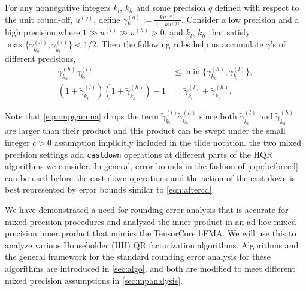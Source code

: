 \documentclass[review,onefignum,onetabnum]{siamart190516}
\begin{document}
\begin{lemma}\label{lem:mp}
	For any nonnegative integers $k_l$, $k_h$ and some precision $q$ defined with respect to the unit round-off, $u^{(q)}$, define $\gamma^{(q)}_{k} := \frac{k u^{(q)} }{1-ku^{(q)}}$.
	Consider a low precision and a high precision where $1 \gg u^{(l)} \gg u^{(h)}>0$, and $k_l$, $k_h$ that satisfy $\max\{\gamma^{(h)}_{k_{h}},\gamma^{(l)}_{k_{l}}\} < 1/2$.
	Then the following rules help us accumulate $\gamma$'s of different precisions,
	\begin{align}
	\gamma^{(h)}_{k_{h}}\gamma^{(l)}_{k_{l}} &\leq \min\{\gamma^{(h)}_{k_{h}},\gamma^{(l)}_{k_{l}} \},\\ 
	(1+\tilde{\gamma}_{k_l}^{(l)})(1+\tilde{\gamma}_{k_h}^{(h)}) -1 &= \tilde{\gamma}_{k_l}^{(l)}+\tilde{\gamma}_{k_h}^{(h)}. \label{eqn:mpgamma}
	\end{align}
\end{lemma}
Note that \cref{eqn:mpgamma} drops the term $\tilde{\gamma}_{k_l}^{(l)}\tilde{\gamma}_{k_h}^{(h)}$ since both $\tilde{\gamma}_{k_l}^{(l)}$ and $\tilde{\gamma}_{k_h}^{(h)}$ are larger than their product and this product can be swept under the small integer $c > 0$ assumption implicitly included in the tilde notation.
the two mixed precision settings add {\tt castdown} operations at different parts of the HQR algorithms we consider.
In general, error bounds in the fashion of \cref{eqn:beforecd} can be used before the cast down operations and the action of the cast down is best represented by error bounds similar to \cref{eqn:aftercd}.\par

We have demonstrated a need for rounding error analysis that is accurate for mixed precision procedures and analyzed the inner product in an ad hoc mixed precision inner product that mimics the TensorCore bFMA.
We will use this to analyze various Householder (HH) QR factorization algorithms.
Algorithms and the general framework for the standard rounding error analysis for these algorithms are introduced in \cref{sec:algo}, and both are modified to meet different mixed precision assumptions in \cref{sec:mpanalysis}.
\end{document}
